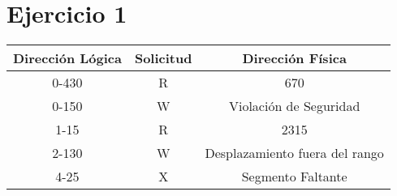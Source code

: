 \documentclass[12pt]{article}
\begin{document}
	\section*{Ejercicio 1}
	\begin{Large}
	\begin{center}
		\begin{tabular}{ c | c | c }
			\textbf{Dirección Lógica} & \textbf{Solicitud} & \textbf{Dirección Física} \\ \hline
			0-430 & R & 670 \\ 
			0-150 & W & Violación de Seguridad \\
			1-15 & R & 2315 \\
			2-130 & W & Desplazamiento fuera del rango \\
			4-25 & X & Segmento Faltante \\
		\end{tabular}
	\end{center}
	\end{Large}
\end{document}
